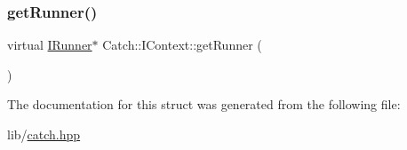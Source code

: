 \hypertarget{struct_catch_1_1_i_context_af088415dde18d039ed5a2f95b02767c6}{}\label{struct_catch_1_1_i_context_af088415dde18d039ed5a2f95b02767c6} 
\subsubsection{\texorpdfstring{get\+Runner()}{getRunner()}}
{\footnotesize\ttfamily virtual \hyperlink{struct_catch_1_1_i_runner}{I\+Runner}$\ast$ Catch\+::\+I\+Context\+::get\+Runner (\begin{DoxyParamCaption}{ }\end{DoxyParamCaption})\hspace{0.3cm}{\ttfamily [pure virtual]}}



The documentation for this struct was generated from the following file\+:\begin{DoxyCompactItemize}
\item 
lib/\hyperlink{catch_8hpp}{catch.\+hpp}\end{DoxyCompactItemize}
